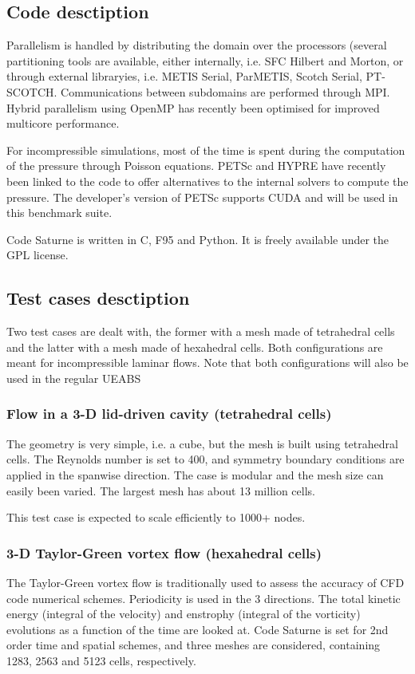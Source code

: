 \subsection{Code desctiption}
Parallelism is handled by distributing the domain over the processors (several partitioning tools are available, either internally, i.e. SFC Hilbert and Morton, or through external libraryies, i.e. METIS Serial, ParMETIS, Scotch Serial, PT-SCOTCH. Communications between subdomains are performed through MPI. Hybrid parallelism using OpenMP has recently been optimised for improved multicore performance.

For incompressible simulations, most of the time is spent during the computation of the pressure through Poisson equations. PETSc and HYPRE have recently been linked to the code to offer alternatives to the internal solvers to compute the pressure. The developer’s version of PETSc supports CUDA and will be used in this benchmark suite.

Code Saturne is written in C, F95 and Python. It is freely available under the GPL license.

\subsection{Test cases desctiption}
Two test cases are dealt with, the former with a mesh made of tetrahedral cells and the latter with a mesh made of hexahedral cells. Both configurations are meant for incompressible laminar flows. Note that both configurations will also be used in the regular UEABS

\subsubsection{Flow in a 3-D lid-driven cavity (tetrahedral cells)}
The geometry is very simple, i.e. a cube, but the mesh is built using tetrahedral cells. The Reynolds number is set to 400, and symmetry boundary conditions are applied in the spanwise direction. The case is modular and the mesh size can easily been varied. The largest mesh has about 13 million cells.

This test case is expected to scale efficiently to 1000+ nodes.

\subsubsection{3-D Taylor-Green vortex flow (hexahedral cells)}
The Taylor-Green vortex flow is traditionally used to assess the accuracy of CFD code numerical schemes. Periodicity is used in the 3 directions. The total kinetic energy (integral of the velocity) and enstrophy (integral of the vorticity) evolutions as a function of the time are looked at. Code Saturne is set for 2nd order time and spatial schemes, and three meshes are considered, containing 1283, 2563 and 5123 cells, respectively.

